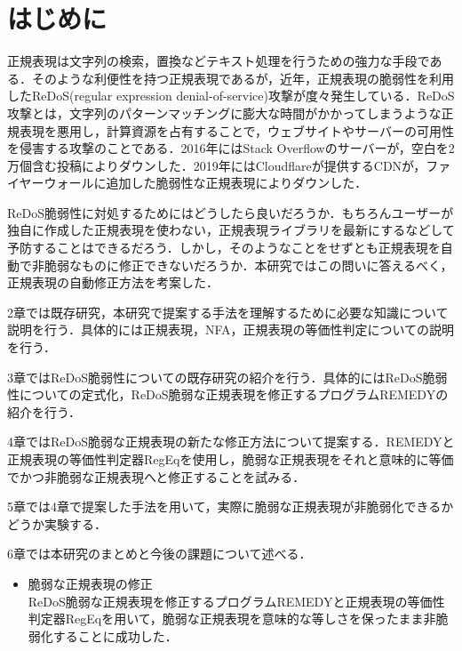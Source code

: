 \documentclass[a4paper, 12pt, dvipdfmx, uplatex]{jsreport}
\begin{document}
\chapter{はじめに}
正規表現は文字列の検索，置換などテキスト処理を行うための強力な手段である．そのような利便性を持つ正規表現であるが，近年，正規表現の脆弱性を利用したReDoS(regular expression denial-of-service)攻撃が度々発生している．ReDoS攻撃とは，文字列のパターンマッチングに膨大な時間がかかってしまうような正規表現を悪用し，計算資源を占有することで，ウェブサイトやサーバーの可用性を侵害する攻撃のことである．2016年にはStack Overflowのサーバーが，空白を2万個含む投稿によりダウンした\cite{stackoverflow}．2019年にはCloudflareが提供するCDNが，ファイヤーウォールに追加した脆弱性な正規表現によりダウンした\cite{cloudflare}．


ReDoS脆弱性に対処するためにはどうしたら良いだろうか．もちろんユーザーが独自に作成した正規表現を使わない，正規表現ライブラリを最新にするなどして予防することはできるだろう．しかし，そのようなことをせずとも正規表現を自動で非脆弱なものに修正できないだろうか．本研究ではこの問いに答えるべく，正規表現の自動修正方法を考案した．

2章では既存研究，本研究で提案する手法を理解するために必要な知識について説明を行う．具体的には正規表現，NFA，正規表現の等価性判定についての説明を行う．

3章ではReDoS脆弱性についての既存研究の紹介を行う．具体的にはReDoS脆弱性についての定式化，ReDoS脆弱な正規表現を修正するプログラムREMEDYの紹介を行う．

4章ではReDoS脆弱な正規表現の新たな修正方法について提案する．REMEDYと正規表現の等価性判定器RegEqを使用し，脆弱な正規表現をそれと意味的に等価でかつ非脆弱な正規表現へと修正することを試みる．

5章では4章で提案した手法を用いて，実際に脆弱な正規表現が非脆弱化できるかどうか実験する．

6章では本研究のまとめと今後の課題について述べる．

\begin{itemize}
  \item 脆弱な正規表現の修正\\
  ReDoS脆弱な正規表現を修正するプログラムREMEDYと正規表現の等価性判定器RegEqを用いて，脆弱な正規表現を意味的な等しさを保ったまま非脆弱化することに成功した．
\end{itemize}





\end{document}
